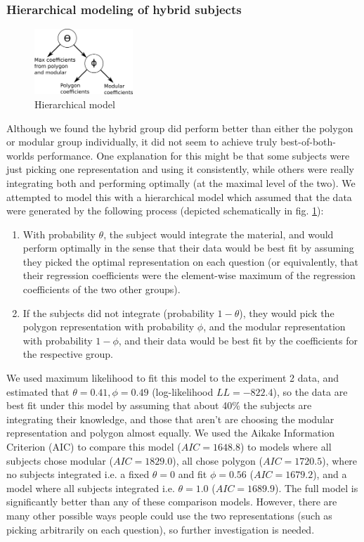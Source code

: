 \documentclass[man,10pt]{apa6}
\begin{document}
\subsubsection{Hierarchical modeling of hybrid subjects}
\begin{figure}
\centering
\includegraphics[width=0.33\textwidth]{figures/hierarchical_model_schematic.png}
\caption{Hierarchical model}
\label{hierarchicalmodel}

\end{figure}
Although we found the hybrid group did perform better than either the polygon or modular group individually, it did not seem to achieve truly best-of-both-worlds performance. One explanation for this might be that some subjects were just picking one representation and using it consistently, while others were really integrating both and performing optimally (at the maximal level of the two). We attempted to model this with a hierarchical model which assumed that the data were generated by the following process (depicted schematically in fig. \ref{hierarchicalmodel}): 
\begin{enumerate}
\item With probability $\theta$, the subject would integrate the material, and would perform optimally in the sense that their data would be best fit by assuming they picked the optimal representation on each question (or equivalently, that their regression coefficients were the element-wise maximum of the regression coefficients of the two other groups). 
\item If the subjects did not integrate (probability $1-\theta$), they would pick the polygon representation with probability $\phi$, and the modular representation with probability $1-\phi$, and their data would be best fit by the coefficients for the respective group.
\end{enumerate}
We used maximum likelihood to fit this model to the experiment 2 data, and estimated that $\theta = 0.41, \phi = 0.49$ (log-likelihood $LL=-822.4$), so the data are best fit under this model by assuming that about 40\% the subjects are integrating their knowledge, and those that aren't are choosing the modular representation and polygon almost equally. We used the Aikake Information Criterion (AIC) to compare this model ($AIC = 1648.8$) to models where all subjects chose modular ($AIC=1829.0$), all chose polygon ($AIC = 1720.5$), where no subjects integrated i.e. a fixed $\theta = 0$ and fit $\phi = 0.56$ ($AIC = 1679.2$), and a model where all subjects integrated i.e. $\theta = 1.0$ ($AIC = 1689.9$). The full model is significantly better than any of these comparison models. However, there are many other possible ways people could use the two representations (such as picking arbitrarily on each question), so further investigation is needed.\par
\end{document}
